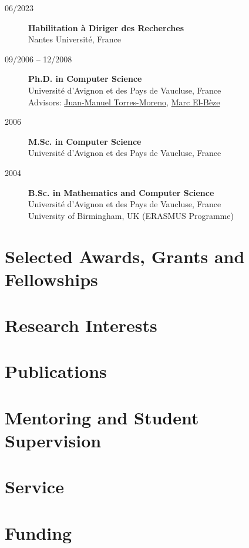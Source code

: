 \documentclass[11pt,a4paper]{article}
\begin{document}
\begin{description}

    \item[06/2023] \textbf{Habilitation à Diriger des Recherches} \\
                    Nantes Université, France

    \item[09/2006 -- 12/2008] \textbf{Ph.D. in Computer Science} \\
                                Université d'Avignon et des Pays de Vaucluse, France \\
                                Advisors: 
                                \href{http://lia.univ-avignon.fr/chercheurs/torres/}{Juan-Manuel Torres-Moreno},
                                \href{http://lia.univ-avignon.fr/user/48}{Marc El-Bèze}
                                
    \item[2006] \textbf{M.Sc. in Computer Science} \\
                Université d'Avignon et des Pays de Vaucluse, France

    \item[2004] \textbf{B.Sc. in Mathematics and Computer Science} \\
                Université d'Avignon et des Pays de Vaucluse, France \\
                University of Birmingham, UK (ERASMUS Programme)
    
\end{description}

\section*{Selected Awards, Grants and Fellowships}


\section{Research Interests}


\section{Publications}


\section*{Mentoring and Student Supervision}


\section*{Service}


\section*{Funding}

\end{document}
